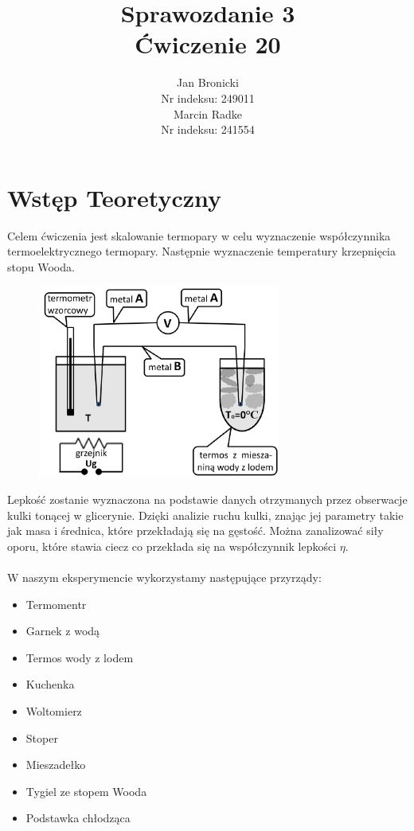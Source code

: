 \documentclass{article}
\title{Sprawozdanie 3\\ Ćwiczenie 20}
\author{Jan Bronicki \\
Nr indeksu: 249011\\
Marcin Radke\\
Nr indeksu: 241554}
\date{}
\begin{document}
\maketitle
\section{Wstęp Teoretyczny}
Celem ćwiczenia jest skalowanie termopary w celu wyznaczenie współczynnika termoelektrycznego termopary. Następnie wyznaczenie temperatury krzepnięcia stopu Wooda.\\
\begin{figure}[h]
    \centering
    \includegraphics[width=8cm]{schemat_ukladu.png}
\end{figure}
Lepkość zostanie wyznaczona na podstawie danych otrzymanych przez obserwacje kulki 
tonącej w glicerynie. Dzięki analizie ruchu kulki, znając jej parametry takie 
jak masa i średnica, które przekładają się na gęstość. Można zanalizować siły oporu,
które stawia ciecz co przekłada się na współczynnik lepkości $\eta$.\\ \\
W naszym eksperymencie wykorzystamy następujące przyrządy:\\
\begin{itemize}
    \item Termomentr
    \item Garnek z wodą
    \item Termos wody z lodem
    \item Kuchenka
    \item Woltomierz
    \item Stoper
    \item Mieszadełko
    \item Tygiel ze stopem Wooda
    \item Podstawka chłodząca
\end{itemize}
\end{document}
